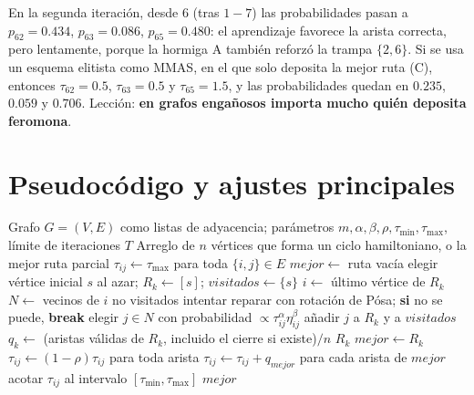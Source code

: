 \documentclass[11pt,letterpaper]{article}
\theoremstyle{definition}
\begin{document}
En la segunda iteración, desde 6 (tras $1\!-\!7$) las probabilidades pasan a
$p_{62}=0.434$, $p_{63}=0.086$, $p_{65}=0.480$: el aprendizaje favorece la arista correcta,
pero lentamente, porque la hormiga A también reforzó la trampa $\{2,6\}$. Si se usa un
esquema elitista como MMAS, en el que solo deposita la mejor ruta (C), entonces
$\tau_{62}=0.5$, $\tau_{63}=0.5$ y $\tau_{65}=1.5$, y las probabilidades quedan en
$0.235$, $0.059$ y $0.706$. Lección: \textbf{en grafos engañosos importa mucho quién
deposita feromona}.

\section{Pseudocódigo y ajustes principales}

\begin{algorithm}[H]
\caption{ACO para el ciclo hamiltoniano (variante estilo MMAS)}
\label{alg:aco}
\begin{algorithmic}[1]
\Require Grafo $G=(V,E)$ como listas de adyacencia; parámetros $m,\alpha,\beta,\rho,
         \tau_{\min},\tau_{\max}$, límite de iteraciones $T$
\Ensure Arreglo de $n$ vértices que forma un ciclo hamiltoniano, o la mejor ruta parcial
\State $\tau_{ij}\gets\tau_{\max}$ para toda $\{i,j\}\in E$
\State $\mathit{mejor}\gets$ ruta vacía
    \State elegir vértice inicial $s$ al azar; $R_k\gets[s]$; $\mathit{visitados}\gets\{s\}$
      \State $i\gets$ último vértice de $R_k$
      \State $N\gets$ vecinos de $i$ no visitados
        \State intentar reparar con rotación de Pósa; \textbf{si} no se puede, \textbf{break}
      \Else
        \State elegir $j\in N$ con probabilidad $\propto\tau_{ij}^{\alpha}\eta_{ij}^{\beta}$
        \State añadir $j$ a $R_k$ y a $\mathit{visitados}$
      \EndIf
    \EndWhile
    \State $q_k\gets$ (aristas válidas de $R_k$, incluido el cierre si existe)$/n$
     \Return $R_k$ 
    \EndIf
     $\mathit{mejor}\gets R_k$
    \EndIf
  \EndFor
  \State $\tau_{ij}\gets(1-\rho)\tau_{ij}$ para toda arista 
  \State $\tau_{ij}\gets\tau_{ij}+q_{\mathit{mejor}}$ para cada arista de $\mathit{mejor}$
  \State acotar $\tau_{ij}$ al intervalo $[\tau_{\min},\tau_{\max}]$
\EndFor
\State \Return $\mathit{mejor}$
\end{algorithmic}
\end{algorithm}
\end{document}
